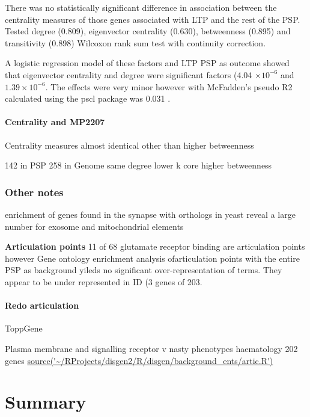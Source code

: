     There was no statistically significant difference in association between the centrality measures of those genes associated with LTP and the rest of the PSP. Tested degree (0.809), eigenvector centrality (0.630), betweenness (0.895) and transitivity (0.898) Wilcoxon rank sum test with continuity correction. 
    
    A logistic regression model of these factors and LTP PSP as outcome showed that eigenvector centrality and degree were significant factors (4.04 $\times 10^{-6}$ and $1.39 \times 10^{-6}$. The effects were very minor however with McFadden's pseudo R2 \cite{mcfadden1973conditional} calculated using the pscl package was  0.031 \cite{jackman2017package}.


\paragraph{Centrality and MP2207}

Centrality measures almost identical other than higher betweenness

142 in PSP 258 in Genome
same degree lower k core higher betweenness

\subsubsection{Other notes}


enrichment of genes found in the synapse with orthologs in yeast reveal a large number for exosome and mitochondrial elements




\textbf{Articulation points}
11 of 68 glutamate receptor binding are articulation points however Gene ontology enrichment analysis ofarticulation points with the entire PSP as background yileds no significant over-representation of terms. They appear to be under represented in ID (3 genes of 203.	 	


\paragraph{Redo articulation}
ToppGene

Plasma membrane and signalling receptor v nasty phenotypes
haematology
202 genes
\url{source('~/RProjects/disgen2/R/disgen/background_ents/artic.R')}
\section{Summary}


